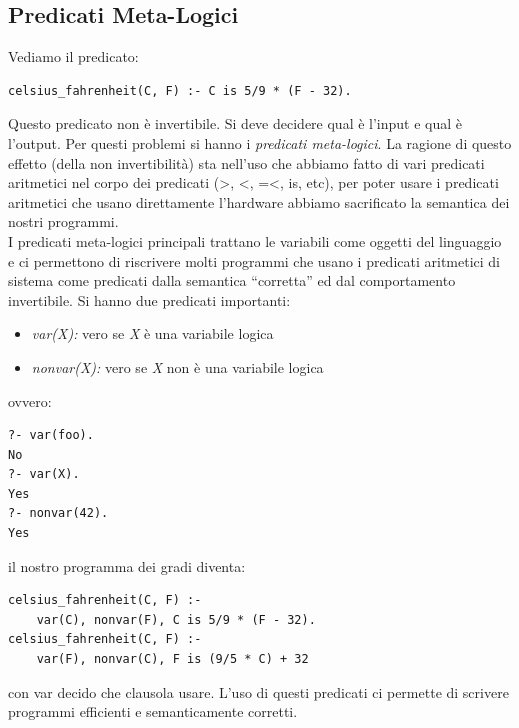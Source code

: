 \documentclass[a4paper,12pt, oneside]{book}
\begin{document}
\subsection{Predicati Meta-Logici}
Vediamo il predicato:
\begin{verbatim}
celsius_fahrenheit(C, F) :- C is 5/9 * (F - 32).
\end{verbatim}
Questo predicato non è invertibile. Si deve decidere qual è l'input e qual è l'output. Per questi problemi si hanno i \textit{predicati meta-logici}. La ragione di questo effetto (della non invertibilità) sta nell'uso che abbiamo fatto di vari predicati aritmetici nel corpo dei predicati (>, <, =<, is, etc), per poter usare i predicati aritmetici che usano direttamente l'hardware abbiamo sacrificato la semantica dei
nostri programmi.\\
I predicati meta-logici principali trattano le variabili come oggetti del linguaggio e ci permettono di riscrivere molti programmi che usano i predicati aritmetici di sistema come predicati dalla semantica “corretta” ed dal comportamento invertibile. Si hanno due predicati importanti:
\begin{itemize}
\item \textit{var(X):}  vero se \textit{X} è una variabile logica
\item \textit{nonvar(X):}  vero se \textit{X} non è una variabile logica
\end{itemize}
ovvero:
\begin{verbatim}
?- var(foo).
No
?- var(X).
Yes
?- nonvar(42).
Yes
\end{verbatim}
il nostro programma dei gradi diventa:
\begin{verbatim}
celsius_fahrenheit(C, F) :- 
	var(C), nonvar(F), C is 5/9 * (F - 32).
celsius_fahrenheit(C, F) :- 
	var(F), nonvar(C), F is (9/5 * C) + 32
\end{verbatim}
con var decido che clausola usare. L'uso di questi predicati ci permette di scrivere programmi efficienti e semanticamente corretti.
\end{document}

